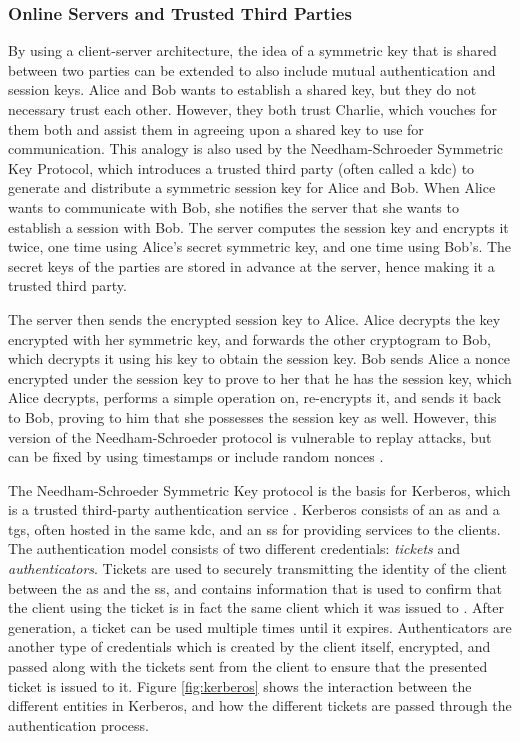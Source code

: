 \subsubsection{Online Servers and Trusted Third Parties}

By using a client-server architecture, the idea of a symmetric key that is shared between two parties can be extended to also include mutual authentication and session keys. Alice and Bob wants to establish a shared key, but they do not necessary trust each other. However, they both trust Charlie, which vouches for them both and assist them in agreeing upon a shared key to use for communication. This analogy is also used by the Needham-Schroeder Symmetric Key Protocol, which introduces a trusted third party (often called a \gls{kdc}) to generate and distribute a symmetric session key for Alice and Bob. When Alice wants to communicate with Bob, she notifies the server that she wants to establish a session with Bob. The server computes the session key and encrypts it twice, one time using Alice's secret symmetric key, and one time using Bob's. The secret keys of the parties are stored in advance at the server, hence making it a trusted third party.

The server then sends the encrypted session key to Alice. Alice decrypts the key encrypted with her symmetric key, and forwards the other cryptogram to Bob, which decrypts it using his key to obtain the session key. Bob sends Alice a nonce encrypted under the session key to prove to her that he has the session key, which Alice decrypts, performs a simple operation on, re-encrypts it, and sends it back to Bob, proving to him that she possesses the session key as well. However, this version of the Needham-Schroeder protocol is vulnerable to replay attacks, but can be fixed by using timestamps or include random nonces \cite{needham1987authentication}.

The Needham-Schroeder Symmetric Key protocol is the basis for Kerberos, which is a trusted third-party authentication service \cite{neuman1994kerberos}. Kerberos consists of an \gls{as} and a \gls{tgs}, often hosted in the same \gls{kdc}, and an \gls{ss} for providing services to the clients. The authentication model consists of two different credentials: \emph{tickets} and \emph{authenticators}. Tickets are used to securely transmitting the identity of the client between the \gls{as} and the \gls{ss}, and contains information that is used to confirm that the client using the ticket is in fact the same client which it was issued to \cite{steiner1988kerberos}. After generation, a ticket can be used multiple times until it expires. Authenticators are another type of credentials which is created by the client itself, encrypted, and passed along with the tickets sent from the client to ensure that the presented ticket is issued to it. Figure \ref{fig:kerberos} shows the interaction between the different entities in Kerberos, and how the different tickets are passed through the authentication process.

